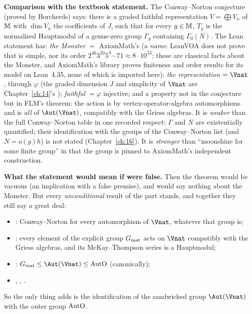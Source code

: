 \begin{dictionary}
\textbf{Comparison with the textbook statement.}  The Conway--Norton conjecture (proved by Borcherds) says: there is a graded
faithful representation $V=\bigoplus V_n$ of $\mathbb{M}$ with $\dim V_n$ the coefficients of $J$, such that for every
$g\in\mathbb{M}$, $T_g$ is the normalised Hauptmodul of a genus-zero group $\Gamma_g$ containing $\Gamma_0(N)$.  The Lean
statement has: \emph{the Monster} $=$ AxiomMath's  (a \emph{name}: LeanVOA does not prove that  is simple,
nor its order $2^{46}3^{20}5^9\cdots71\approx8\cdot10^{53}$; these are classical facts about the Monster, and AxiomMath's library
proves finiteness and order results for its model on Lean~4.35, none of which is imported here); \emph{the representation} $=\Vnat$, through $\varphi$ (the graded
dimension $J$ and simplicity of $\Vnat$ are Chapter~\ref{ch:14}'s ); \emph{faithful} $=\varphi$ injective; and
a property not in the conjecture but in FLM's theorem: the action is by vertex-operator-algebra automorphisms and is
\emph{all} of $\Aut(\Vnat)$, compatibly with the Griess algebras.  It is \emph{weaker} than the full Conway--Norton table in one
recorded respect: $\Gamma$ and $N$ are existentially quantified; their identification with the groups of the Conway--Norton
list (and $N=o(g)h$) is not stated (Chapter~\ref{ch:16}).  It is \emph{stronger} than ``moonshine for some finite group'' in that
the group is pinned to AxiomMath's independent construction.

\textbf{What the statement would mean if  were false.}  Then the theorem would be vacuous (an implication
with a false premise), and would say nothing about the Monster.  But every \emph{unconditional} result of the part stands, and
together they still say a great deal:
\begin{itemize}
\item {}: Conway--Norton for every automorphism of $\Vnat$, whatever that group is;
\item {}: every element of the explicit group $G_{\mathrm{mat}}$ acts on $\Vnat$ compatibly with the
  Griess algebras, and its McKay--Thompson series is a Hauptmodul;
\item {}: $\chtwentytwoGmat\le\Aut(\Vnat)\le\chtwentytwoAutO$ (canonically);
\item {}, , .
\end{itemize}
So the only thing  adds is the identification of the sandwiched group $\Aut(\Vnat)$ with the outer group
$\mathrm{AutO}$.


\end{dictionary}
